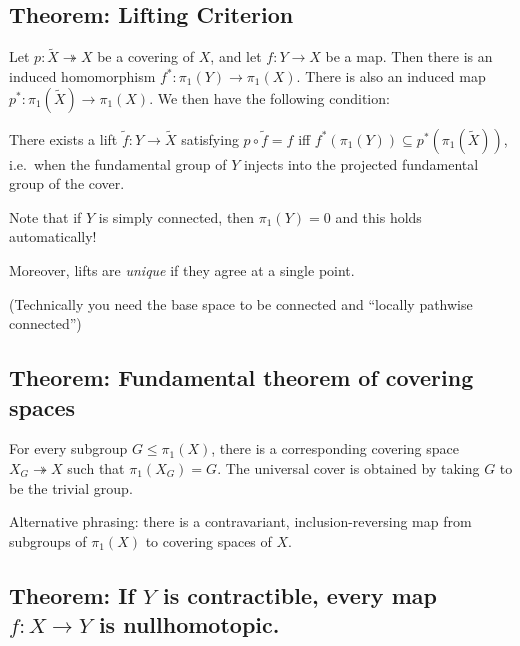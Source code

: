\hypertarget{theorem-lifting-criterion}{%
\subsection{Theorem: Lifting
Criterion}\label{theorem-lifting-criterion}}

Let \(p:\tilde X \twoheadrightarrow X\) be a covering of \(X\), and let
\(f:Y \to X\) be a map. Then there is an induced homomorphism
\(f^*: \pi_1(Y) \to\pi_1(X)\). There is also an induced map
\(p^*: \pi_1(\tilde X) \to\pi_1(X)\). We then have the following
condition:

There exists a lift \(\tilde f: Y \to\tilde X\) satisfying
\(p\circ\tilde f = f\) iff
\(f^*(\pi_1(Y)) \subseteq p^*(\pi_1(\tilde X))\), i.e.~when the
fundamental group of \(Y\) injects into the projected fundamental group
of the cover.

Note that if \(Y\) is simply connected, then \(\pi_1(Y) = 0\) and this
holds automatically!

Moreover, lifts are \emph{unique} if they agree at a single point.

(Technically you need the base space to be connected and ``locally
pathwise connected'')

\hypertarget{theorem-fundamental-theorem-of-covering-spaces}{%
\subsection{Theorem: Fundamental theorem of covering
spaces}\label{theorem-fundamental-theorem-of-covering-spaces}}

For every subgroup \(G \leq \pi_1(X)\), there is a corresponding
covering space \(X_G \twoheadrightarrow X\) such that
\(\pi_1(X_G) = G\). The universal cover is obtained by taking \(G\) to
be the trivial group.

Alternative phrasing: there is a contravariant, inclusion-reversing map
from subgroups of \(\pi_1(X)\) to covering spaces of \(X\).

\hypertarget{theorem-if-y-is-contractible-every-map-f-x-to-y-is-nullhomotopic.}{%
\subsection{\texorpdfstring{Theorem: If \(Y\) is contractible, every map
\(f: X \to Y\) is
nullhomotopic.}{Theorem: If Y is contractible, every map f: X \textbackslash to Y is nullhomotopic.}}\label{theorem-if-y-is-contractible-every-map-f-x-to-y-is-nullhomotopic.}}

